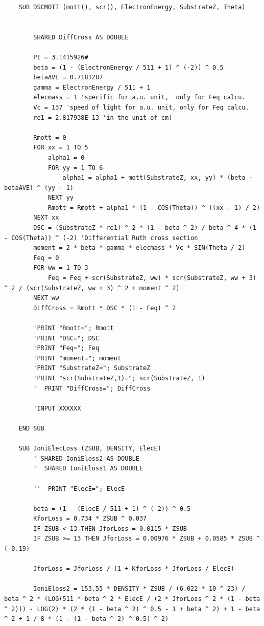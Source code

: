 \documentclass[10pt, reqno]{exam}
\begin{document}
\begin{verbatim}
    SUB DSCMOTT (mott(), scr(), ElectronEnergy, SubstrateZ, Theta)
    
    
        SHARED DiffCross AS DOUBLE
    
        PI = 3.1415926#
        beta = (1 - (ElectronEnergy / 511 + 1) ^ (-2)) ^ 0.5
        betaAVE = 0.7181287
        gamma = ElectronEnergy / 511 + 1
        elecmass = 1 'specific for a.u. unit,  only for Feq calcu.
        Vc = 137 'speed of light for a.u. unit, only for Feq calcu.
        re1 = 2.817938E-13 'in the unit of cm)
    
        Rmott = 0
        FOR xx = 1 TO 5
            alpha1 = 0
            FOR yy = 1 TO 6
                alpha1 = alpha1 + mott(SubstrateZ, xx, yy) * (beta - betaAVE) ^ (yy - 1)
            NEXT yy
            Rmott = Rmott + alpha1 * (1 - COS(Theta)) ^ ((xx - 1) / 2)
        NEXT xx
        DSC = (SubstrateZ * re1) ^ 2 * (1 - beta ^ 2) / beta ^ 4 * (1 - COS(Theta)) ^ (-2) 'Differential Ruth cross section
        moment = 2 * beta * gamma * elecmass * Vc * SIN(Theta / 2)
        Feq = 0
        FOR ww = 1 TO 3
            Feq = Feq + scr(SubstrateZ, ww) * scr(SubstrateZ, ww + 3) ^ 2 / (scr(SubstrateZ, ww + 3) ^ 2 + moment ^ 2)
        NEXT ww
        DiffCross = Rmott * DSC * (1 - Feq) ^ 2
    
        'PRINT "Rmott="; Rmott
        'PRINT "DSC="; DSC
        'PRINT "Feq="; Feq
        'PRINT "moment="; moment
        'PRINT "SubstrateZ="; SubstrateZ
        'PRINT "scr(SubstrateZ,1)="; scr(SubstrateZ, 1)
        '  PRINT "DiffCross="; DiffCross
    
        'INPUT XXXXXX
    
    END SUB
    
    SUB IoniElecLoss (ZSUB, DENSITY, ElecE)
        ' SHARED IoniEloss2 AS DOUBLE
        '  SHARED IoniEloss1 AS DOUBLE
    
        ''  PRINT "ElecE="; ElecE
    
        beta = (1 - (ElecE / 511 + 1) ^ (-2)) ^ 0.5
        KforLoss = 0.734 * ZSUB ^ 0.037
        IF ZSUB < 13 THEN JforLoss = 0.0115 * ZSUB
        IF ZSUB >= 13 THEN JforLoss = 0.00976 * ZSUB + 0.0585 * ZSUB ^ (-0.19)
    
        JforLoss = JforLoss / (1 + KforLoss * JforLoss / ElecE)
    
        IoniEloss2 = 153.55 * DENSITY * ZSUB / (6.022 * 10 ^ 23) / beta ^ 2 * (LOG(511 * beta ^ 2 * ElecE / (2 * JforLoss ^ 2 * (1 - beta ^ 2))) - LOG(2) * (2 * (1 - beta ^ 2) ^ 0.5 - 1 + beta ^ 2) + 1 - beta ^ 2 + 1 / 8 * (1 - (1 - beta ^ 2) ^ 0.5) ^ 2)
    

\end{verbatim}
\end{document}
